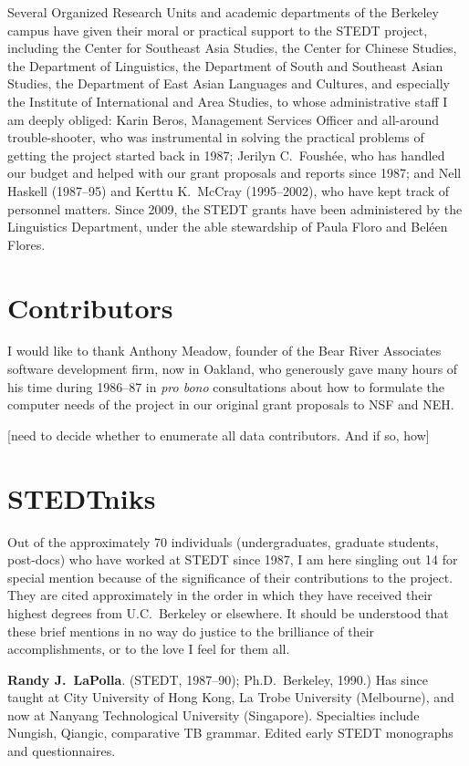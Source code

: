 Several Organized Research Units and academic departments of the Berkeley campus have given their moral or practical support to the STEDT project, including the Center for Southeast Asia Studies, the Center for Chinese Studies, the Department of Linguistics, the Department of South and Southeast Asian Studies, the Department of East Asian Languages and Cultures, and especially the Institute of International and Area Studies, to whose administrative staff I am deeply obliged: Karin Beros, Management Services Officer and all-around trouble-shooter, who was instrumental in solving the practical problems of getting the project started back in 1987; Jerilyn C.\ Foush\'ee, who has handled our budget and helped with our grant proposals and reports since 1987; and Nell Haskell (1987–95) and Kerttu K.\ McCray (1995–2002), who have kept track of personnel matters.  Since 2009, the STEDT grants have been administered by the Linguistics Department, under the able stewardship of Paula Floro and Bel\'een Flores.

\section{Contributors}

I would like to thank Anthony Meadow, founder of the Bear River Associates software development firm, now in Oakland, who generously gave many hours of his time during 1986–87 in {\it pro bono} consultations about how to formulate the computer needs of the project in our original grant proposals to NSF and NEH.

[need to decide whether to enumerate all data contributors. And if so, how]

\section{STEDTniks}

Out of the approximately 70 individuals (undergraduates, graduate students, post-docs) who have worked at STEDT since 1987, I am here singling out 14 for special mention because of the significance of their contributions to the project. They are cited approximately in the order in which they have received their highest degrees from U.C.\ Berkeley or elsewhere. It should be understood that these brief mentions in no way do justice to the brilliance of their accomplishments, or to the love I feel for them all.

\textbf{Randy J.\ LaPolla}. (STEDT, 1987–90); Ph.D.\ Berkeley, 1990.) Has since taught at City University of Hong Kong, La Trobe University (Melbourne), and now at Nanyang Technological University (Singapore). Specialties include Nungish, Qiangic, comparative TB grammar. Edited early STEDT monographs and questionnaires.

